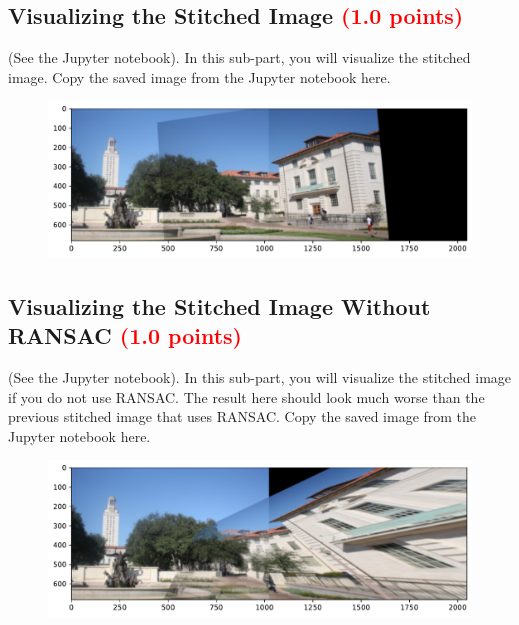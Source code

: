 \documentclass[answers]{exam}
\newcommand{\mypoints}[1]{\textcolor{red}{(#1 points)}}
\begin{document}
\subsection{Visualizing the Stitched Image \mypoints{1.0}}
(See the Jupyter notebook). In this sub-part, you will visualize the stitched image. Copy the saved image from the Jupyter notebook here.

\begin{solution}
\begin{figure}[H]
    \centering
    \includegraphics[width=\linewidth]{Images/question_3_12.pdf}
\end{figure}
\end{solution}

\subsection{Visualizing the Stitched Image Without RANSAC \mypoints{1.0}}
(See the Jupyter notebook). In this sub-part, you will visualize the stitched image if you do not use RANSAC. The result here should look much worse than the previous stitched image that uses RANSAC. Copy the saved image from the Jupyter notebook here.

\begin{solution}
\begin{figure}[H]
    \centering
    \includegraphics[width=\linewidth]{Images/question_3_13.pdf}
\end{figure}
\end{solution}
\end{document}
